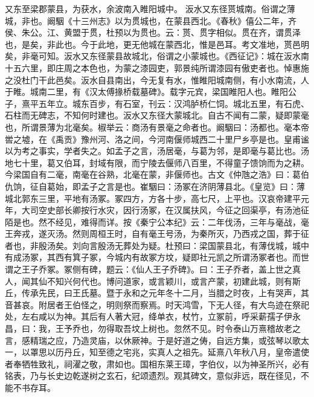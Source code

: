 \documentclass[12pt,UTF8]{ctexbook}
\begin{document}
又东至梁郡蒙县，为获水，余波南入睢阳城中。
汳水又东径贳城南。俗谓之薄城，非也。阚駰《十三州志》以为贯城也，在蒙县西北。《春秋》僖公二年，齐侯、朱公。江、黄盟于贯，杜预以为贯也。云：贳、贯字相似。贯在齐，谓贯泽也，是矣，非此也。今于此地，更无他城在蒙西北，惟是邑耳。考文准地，贳邑明矣，非毫可知。汳水又东径蒙县故城北，俗谓之小蒙城也。《西征记》：城在汳水南十五六里，即庄周之本色也，为蒙之漆园吏，郭景纯所谓漆园有傲吏者也。悼惠施之没杜门干此邑矣。汳水自县南出，今无复有水，惟睢阳城南侧，有小水南流，人于睢。城南二里，有《汉太傅掾桥载墓碑》。载字元宾，梁国睢阳人也。睢阳公子，熹平五年立。城东百步，有石室，刊云：汉鸿胪桥仁饲。城北五里，有石虎、石柱而无碑志，不知何时建也。汳水又东径大蒙城北。自古不闻有二蒙，疑即蒙毫也，所谓景薄为北毫矣。椒举云：商汤有景毫之命者也。阚駰曰：汤都也。毫本帝喾之墟，在《禹贡》豫州河、洛之间，今河南偃师城西二十里尸乡亭是也。皇甫谧以为考之事实，学者失之。如孟子之言，汤居毫，与葛为邻，是即毫与葛比也。汤地七十里，葛又伯耳，封域有限，而宁陵去偃师八百里，不得童子馈饷而为之耕。今梁国自有二毫，南毫在谷熟，北毫在蒙，非偃师也。古文《仲虺之浩》曰：葛伯仇饷，征自葛始，即孟子之言是也。崔駰曰：汤冢在济阴薄县北。《皇览》曰：薄城北郭东三里，平地有汤冢。冢四方，方各十步，高七尺，上平也。汉哀帝建平元年，大司空史部长卿按行水灾，因行汤冢，在汉属扶风，今征之回渠亭，有汤池征陌是也。然不经见，难得而详。按《秦宁公本纪》云：二年伐汤，三年与毫战，毫王奔戎，遂灭汤。然则周桓王时，自有毫王号汤，为秦所灭，乃西戎之国，葬于征者也，非殷汤矣。刘向言殷汤无葬处为疑。杜预曰：梁国蒙县北，有薄伐城，城中有成汤冢，其西有箕子冢，今城内有故冢方坟，疑即社元凯之所谓汤冢者也。而世谓之王子乔冢。冢侧有碑，题云：《仙人王子乔碑》。曰：王子乔者，盖上世之真人，闻其仙不知兴何代也。博问道家，或言颖川，或言产蒙，初建此城，则有斯丘，传承先民，曰王氏墓。暨于永和之元年冬十二月，当腊之时夜，上有哭声，其音甚哀。附居者王伯怪之，明则祭而察焉。时天鸿雪，下无人径，有大鸟迹在祭祀处，左右咸以为神。其后有人著大冠，绛单衣，杖竹，立冢前，呼采薪孺子伊永昌，曰：我，王予乔也，勿得取吾坟上树也。忽然不见。时令泰山万熹稽故老之言，感精瑞之应，乃造灵庙，以休厥神。于是好道之俦，自远方集，或弦琴以歌太一，以罩思以历丹丘，知至德之宅兆，实真人之祖先。延熹八年秋八月，皇帝遣使者奉牺牲致礼，祠濯之敬，肃如也。国相东莱王璋，字伯仪，以为神圣所兴，必有铭表，乃与长史边乾遂树之玄石，纪颂遗烈。观其碑文，意似非远，既在径见，不能不书存耳。
\end{document}
